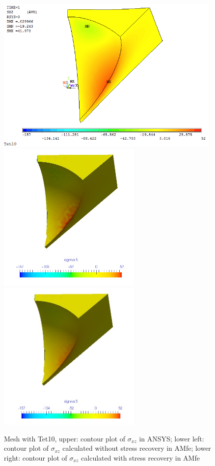 \begin{figure}[htbp]
	\begin{center}
		\includegraphics[width=11cm,clip]{Tet10_Sxz.png} 		
		\includegraphics[width=7cm,clip]{Tet10_Sxz_PD.png} 	
		\includegraphics[width=7cm,clip]{Tet10_Sxz_P.png} 		
		\caption{Mesh with Tet10, upper: contour plot of $\sigma_{xz}$ in ANSYS; lower left: contour plot of $\sigma_{xz}$ calculated without stress recovery in AMfe; lower right: contour plot of $\sigma_{xz}$ calculated with stress recovery in AMfe} \label{fig: Tet10_Sxz}
	\end{center}
\end{figure}
\clearpage 

